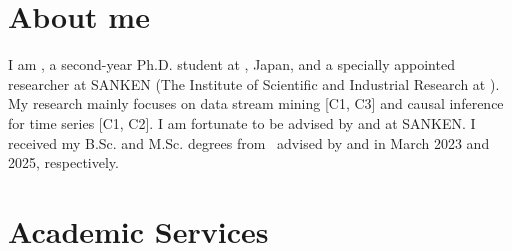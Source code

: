 \documentclass[9pt,a4paper]{article}
\begin{document}

\vspace{-1.0em}


\vspace{-1.5em}

\section{About me}
  \vspace{1.0em}
  I am \MyName, a second-year Ph.D.\! student at \OU, Japan, and a specially appointed researcher at SANKEN (The Institute of Scientific and Industrial Research at \OU).
  My research mainly focuses on data stream mining [C1, C3] and causal inference for time series [C1, C2].
  I am fortunate to be advised by \href{\YSakuraiURL}{\Prof{\YSakurai}} and \href{\YMatsubaraURL}{\Prof{\YMatsubara}} at SANKEN.
  I received my B.Sc.\! and M.Sc.\! degrees from \OU\ advised by \href{\MOnizukaURL}{\Prof{\MOnizuka}} and \href{\YSakuraiURL}{\Prof{\YSakurai}} in March 2023 and 2025, respectively.
  \vspace{0.2em}
  \\
  

\section{\Education}
  

\section{\Experience}
  

\section{\Awards}
  

\section{\Publications}
  

\section{Academic Services}
  
\end{document}
